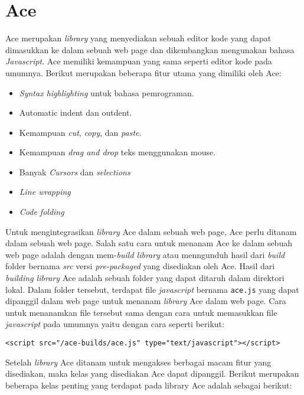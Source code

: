 \section{Ace}
\label{sec:2:ace}

Ace merupakan \textit{library} yang menyediakan sebuah editor kode yang dapat dimasukkan ke dalam sebuah web page dan dikembangkan mengunakan bahasa \textit{Javascript}. Ace memiliki kemampuan yang sama seperti editor kode pada umumnya. Berikut merupakan beberapa fitur utama yang dimiliki oleh Ace:

\begin{itemize}
	\item \textit{Syntax highlighting} untuk bahasa pemrograman.
	\item Automatic indent dan  outdent.
	\item Kemampuan \textit{cut}, \textit{copy}, dan \textit{paste}.
	\item Kemampuan \textit{drag and drop} teks menggunakan mouse.
	\item Banyak \textit{Cursors} dan \textit{selections}
	\item \textit{Line wrapping}
	\item \textit{Code folding}
\end{itemize}

Untuk mengintegrasikan \textit{library} Ace dalam sebuah web page, Ace perlu ditanam dalam sebuah web page. Salah satu cara untuk menanam Ace ke dalam sebuah web page adalah dengan mem-\textit{build library} atau menngunduh hasil dari \textit{build} folder bernama \textit{src} versi \textit{pre-packaged} yang disediakan oleh Ace. Hasil dari \textit{building library} Ace adalah sebuah folder yang dapat ditaruh dalam direktori lokal. Dalam folder tersebut, terdapat file \textit{javascript} bernama \verb|ace.js| yang dapat dipanggil dalam web page untuk menanam \textit{library} Ace dalam web page. Cara untuk menanamkan file tersebut sama dengan cara untuk memasukkan file \textit{javascript} pada umumnya yaitu dengan cara seperti berikut:

\begin{center}
	\verb|<script src="/ace-builds/ace.js" type="text/javascript"></script>|
\end{center}

Setelah \textit{library} Ace ditanam untuk mengakses berbagai macam fitur yang disediakan, maka kelas yang disediakan Ace dapat dipanggil. Berikut merupakan beberapa kelas penting yang terdapat pada library Ace adalah sebagai berikut:

